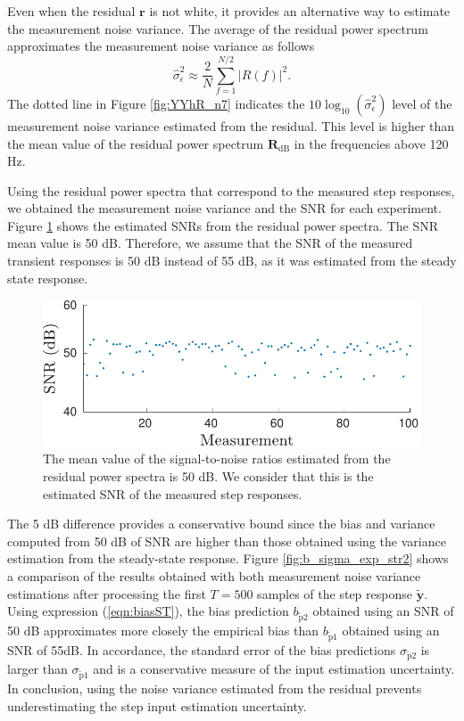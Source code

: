 Even when the residual $\mathbf{r}$ is not white, it provides an alternative way to estimate the measurement noise variance. 
The average of the residual power spectrum approximates the measurement noise variance as follows
\begin{equation} \widehat{\sigma}_\epsilon^2 \approx \dfrac{2}{N} \sum_{f = 1}^{N/2} \left| R \left( f \right) \right|^2 . \label{eqn:P_R} \end{equation}
The dotted line in Figure \ref{fig:YYhR_n7} indicates the $10 \log_{10} \left( \widehat{\sigma}_\epsilon^2 \right)$ level of the measurement noise variance estimated from the residual.
This level is higher than the mean value of the residual power spectrum $\mathbf{R}_\mathrm{dB}$ in the frequencies above 120 Hz.

Using the residual power spectra that correspond to the measured step responses, we obtained the measurement noise variance and the SNR for each experiment.
Figure \ref{fig:meas_SNR} shows the estimated SNRs from the residual power spectra. 
The SNR mean value is 50 dB.
Therefore, we assume that the SNR of the measured transient responses is 50 dB instead of 55 dB, as it was estimated from the steady state response.

\begin{figure}[!htb]
\centering
\includegraphics[width=1.0\columnwidth]{./ChapterExperimentalValidation/fig/Fig_10.pdf}
\caption{ \label{fig:meas_SNR} 
The mean value of the signal-to-noise ratios estimated from the residual power spectra is 50 dB.
We consider that this is the estimated SNR of the measured step responses.}
\end{figure}

The 5 dB difference provides a conservative bound since the bias and variance computed from 50 dB of SNR are higher than those obtained using the variance estimation from the steady-state response. 
Figure \ref{fig:b_sigma_exp_str2} shows a comparison of the results obtained with both measurement noise variance estimations after processing the first $T=500$ samples of the step response $\widetilde{\mathbf{y}}$.
Using expression (\ref{eqn:biasST}), the bias prediction  $b_{\widetilde{\mathrm{p}}2}$ obtained using an SNR of 50 dB approximates more closely the empirical bias than $b_{\widetilde{\mathrm{p}}1}$ obtained using an SNR of 55dB.
In accordance, the standard error of the bias predictions $\sigma_{\widetilde{\mathrm{p}}2}$ is larger than $\sigma_{\widetilde{\mathrm{p}}1}$ and is a conservative measure of the input estimation uncertainty.
In conclusion, using the noise variance estimated from the residual prevents underestimating the step input estimation uncertainty.


